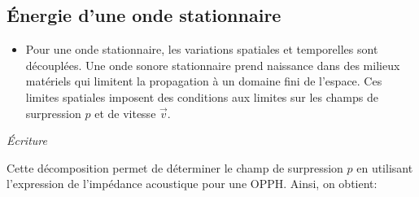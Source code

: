 \documentclass[a4paper, 12pt]{article}
\begin{document}
\subsection{Énergie d'une onde stationnaire}

\begin{itemize}
\item Pour une onde stationnaire, les variations spatiales et temporelles sont découplées. Une onde sonore stationnaire prend naissance dans des milieux matériels qui limitent la propagation à un domaine fini de l'espace. Ces limites spatiales imposent des conditions aux limites sur les champs de surpression $p$ et de vitesse $\overrightarrow{v}$. 
\end{itemize}

\textit{Écriture}

\noindent{}

Cette décomposition permet de déterminer le champ de surpression $p$ en utilisant l'expression de l'impédance acoustique pour une OPPH. Ainsi, on obtient:
\begin{center}
\end{center}
\end{document}
